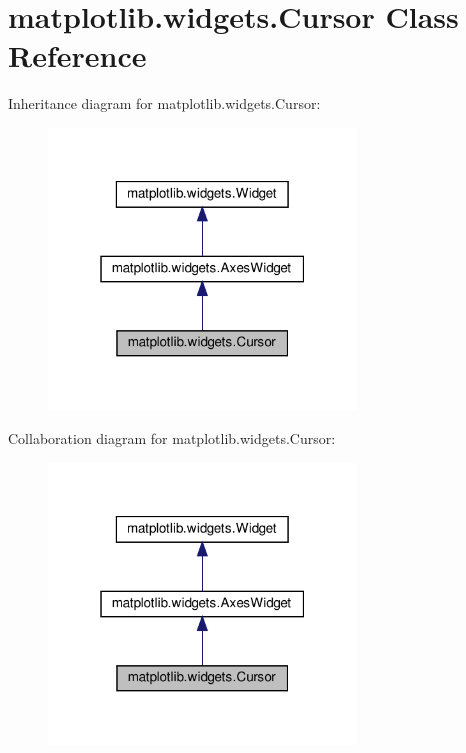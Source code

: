 \hypertarget{classmatplotlib_1_1widgets_1_1Cursor}{}\section{matplotlib.\+widgets.\+Cursor Class Reference}
\label{classmatplotlib_1_1widgets_1_1Cursor}


Inheritance diagram for matplotlib.\+widgets.\+Cursor\+:
\nopagebreak
\begin{figure}[H]
\begin{center}
\leavevmode
\includegraphics[width=232pt]{classmatplotlib_1_1widgets_1_1Cursor__inherit__graph}
\end{center}
\end{figure}


Collaboration diagram for matplotlib.\+widgets.\+Cursor\+:
\nopagebreak
\begin{figure}[H]
\begin{center}
\leavevmode
\includegraphics[width=232pt]{classmatplotlib_1_1widgets_1_1Cursor__coll__graph}
\end{center}
\end{figure}
